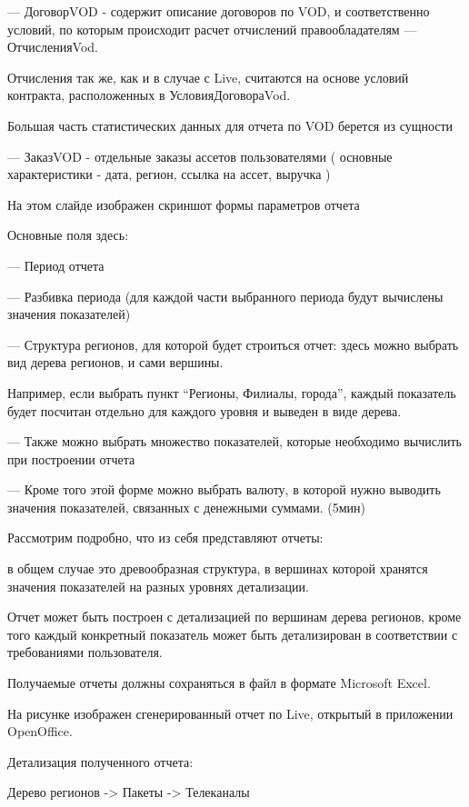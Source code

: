 \documentclass[a4paper]{article}
\begin{document}
--- ДоговорVOD - содержит описание договоров по VOD, и соответственно условий, по которым происходит 
расчет отчислений правообладателям --- ОтчисленияVod.

Отчисления так же, как и в случае с Live, считаются на основе условий контракта, расположенных в УсловияДоговораVod.

\newpage

Большая часть статистических данных для отчета по VOD берется из сущности

--- ЗаказVOD - отдельные заказы ассетов пользователями ( основные характеристики - дата, регион, ссылка на ассет, выручка )

\newpage
На этом слайде изображен скриншот формы параметров отчета

Основные поля здесь:

--- Период отчета

--- Разбивка периода (для каждой части выбранного периода будут вычислены значения показателей)

\newpage
--- Структура регионов, для которой будет строиться отчет: здесь можно выбрать вид дерева регионов, и сами вершины.

Например, если выбрать пункт “Регионы, Филиалы, города”, каждый показатель будет посчитан отдельно для каждого уровня и выведен в виде дерева.


\newpage
--- Также можно выбрать множество показателей, которые необходимо вычислить при построении отчета

--- Кроме того этой форме можно выбрать валюту, в которой нужно выводить значения показателей, связанных с денежными суммами.
(5мин)

\newpage
Рассмотрим подробно, что из себя представляют отчеты:

в общем случае это древообразная структура, в вершинах которой хранятся значения показателей
на разных уровнях детализации.

Отчет может быть построен с детализацией 
по вершинам дерева регионов, кроме того каждый конкретный показатель может быть детализирован
в соответствии с требованиями пользователя.

Получаемые отчеты должны сохраняться в файл в формате Microsoft Excel.

\newpage
На рисунке изображен сгенерированный отчет по Live, открытый в приложении OpenOffice.

Детализация полученного отчета:

Дерево регионов -> Пакеты -> Телеканалы
\end{document}
